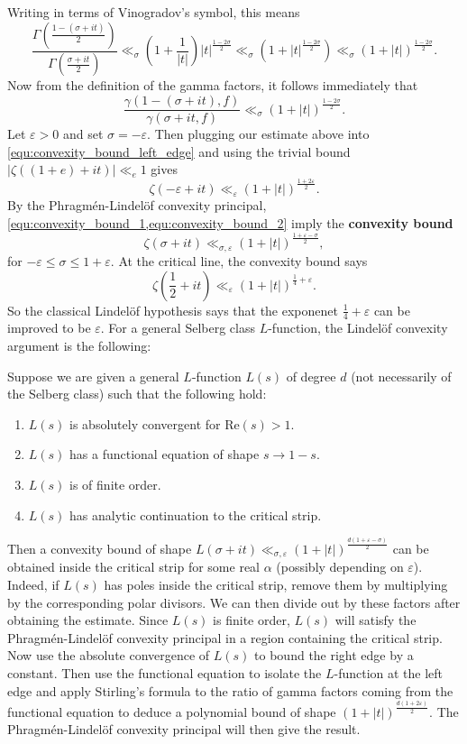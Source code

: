 \documentclass[12pt]{book}
\theoremstyle{definition}\newframedtheorem{method}{Method}
\renewcommand{\a}{\alpha}
\newcommand{\g}{\gamma}
\newcommand{\z}{\zeta}
\newcommand{\s}{\sigma}
\newcommand{\G}{\Gamma}
\newcommand{\e}{\varepsilon}
\newcommand{\<}{\langle}
\renewcommand{\>}{\rangle}
\renewcommand{\Re}{\mathrm{Re}}
\begin{document}
    Writing in terms of Vinogradov's symbol, this means
    \[
      \frac{\G\left(\frac{1-(\s+it)}{2}\right)}{\G\left(\frac{\s+it}{2}\right)} \ll_{\s} \left(1+\frac{1}{|t|}\right)|t|^{\frac{1-2\s}{2}} \ll_{\s} (1+|t|^{\frac{1-2\s}{2}}) \ll_{\s} (1+|t|)^{\frac{1-2\s}{2}}.
    \]
    Now from the definition of the gamma factors, it follows immediately that
    \[
     \frac{\g(1-(\s+it),f)}{\g(\s+it,f)} \ll_{\s} (1+|t|)^{\frac{1-2\s}{2}}.
    \]
    Let $\e > 0$ and set $\s = -\e$. Then plugging our estimate above into \cref{equ:convexity_bound_left_edge} and using the trivial bound $|\z((1+e)+it)| \ll_{e} 1$ gives
    \begin{equation}\label{equ:convexity_bound_2}
      \z(-\e+it) \ll_{\e} (1+|t|)^{\frac{1+2\e}{2}}.
    \end{equation}
    By the Phragm\'en-Lindel\"of convexity principal, \cref{equ:convexity_bound_1,equ:convexity_bound_2} imply the \textbf{convexity bound}
    \[
      \z(\s+it) \ll_{\s,\e} (1+|t|)^{\frac{1+\e-\s}{2}},
    \]
    for $-\e \le \s \le 1+\e$. At the critical line, the convexity bound says
    \begin{equation}\label{equ:convexity_bound_zeta_function}
      \z\left(\frac{1}{2}+it\right) \ll_{\e} (1+|t|)^{\frac{1}{4}+\e}.
    \end{equation}
    So the classical Lindel\"of hypothesis says that the exponenet $\frac{1}{4}+\e$ can be improved to be $\e$. For a general Selberg class $L$-function, the Lindel\"of convexity argument is the following:

    \begin{method}
      Suppose we are given a general $L$-function $L(s)$ of degree $d$ (not necessarily of the Selberg class) such that the following hold:
      \begin{enumerate}[label=(\roman*)]
        \item $L(s)$ is absolutely convergent for $\Re(s) > 1$.
        \item $L(s)$ has a functional equation of shape $s \to 1-s$.
        \item $L(s)$ is of finite order.
        \item $L(s)$ has analytic continuation to the critical strip.
      \end{enumerate}
      Then a convexity bound of shape $L(\s+it) \ll_{\s,\e} (1+|t|)^{\frac{d(1+\e-\s)}{2}}$ can be obtained inside the critical strip for some real $\a$ (possibly depending on $\e$). Indeed, if $L(s)$ has poles inside the critical strip, remove them by multiplying by the corresponding polar divisors. We can then divide out by these factors after obtaining the estimate. Since $L(s)$ is finite order, $L(s)$ will satisfy the Phragm\'en-Lindel\"of convexity principal in a region containing the critical strip. Now use the absolute convergence of $L(s)$ to bound the right edge by a constant. Then use the functional equation to isolate the $L$-function at the left edge and apply Stirling's formula to the ratio of gamma factors coming from the functional equation to deduce a polynomial bound of shape $(1+|t|)^{\frac{d(1+2\e)}{2}}$. The Phragm\'en-Lindel\"of convexity principal will then give the result.
    \end{method}
\end{document}
